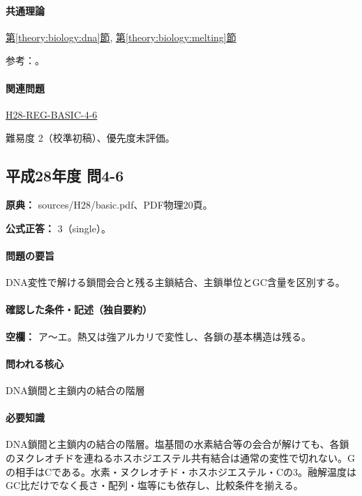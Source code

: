 \paragraph{共通理論} \hyperref[theory:biology:dna]{第\ref*{theory:biology:dna}節}, \hyperref[theory:biology:melting]{第\ref*{theory:biology:melting}節}

\par 参考：\cite{bu_dna_melting,nhgri_dna}。

\paragraph{関連問題} \hyperref[q:h28-reg-basic-4-6]{H28-REG-BASIC-4-6}

\par 難易度 2（校準初稿）、優先度未評価。

\subsection{平成28年度 問4-6}
\label{q:h28-reg-basic-4-6}

\noindent\textbf{原典：} sources/H28/basic.pdf、PDF物理20頁。

\textbf{公式正答：} 3（single）。

\paragraph{問題の要旨} DNA変性で解ける鎖間会合と残る主鎖結合、主鎖単位とGC含量を区別する。

\paragraph{確認した条件・記述（独自要約）}\mbox{}\par

\noindent\textbf{空欄：} ア〜エ。熱又は強アルカリで変性し、各鎖の基本構造は残る。\par

\paragraph{問われる核心} DNA鎖間と主鎖内の結合の階層

\paragraph{必要知識} DNA鎖間と主鎖内の結合の階層。塩基間の水素結合等の会合が解けても、各鎖のヌクレオチドを連ねるホスホジエステル共有結合は通常の変性で切れない。Gの相手はCである。水素・ヌクレオチド・ホスホジエステル・Cの3。融解温度はGC比だけでなく長さ・配列・塩等にも依存し、比較条件を揃える。

